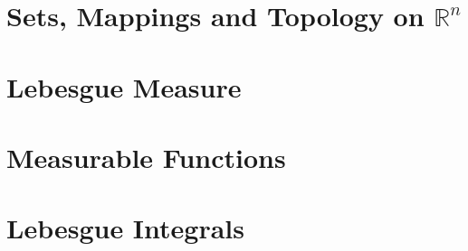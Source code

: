 \documentclass{report}
\begin{document}
	
	\thispagestyle{empty}
	\newpage%
	\tableofcontents
  
  \chapter{Sets, Mappings and Topology on $\mathbb{R}^n$}
  
  \chapter{Lebesgue Measure}
  
  \chapter{Measurable Functions}
  
  \chapter{Lebesgue Integrals}
  
  
\end{document}
